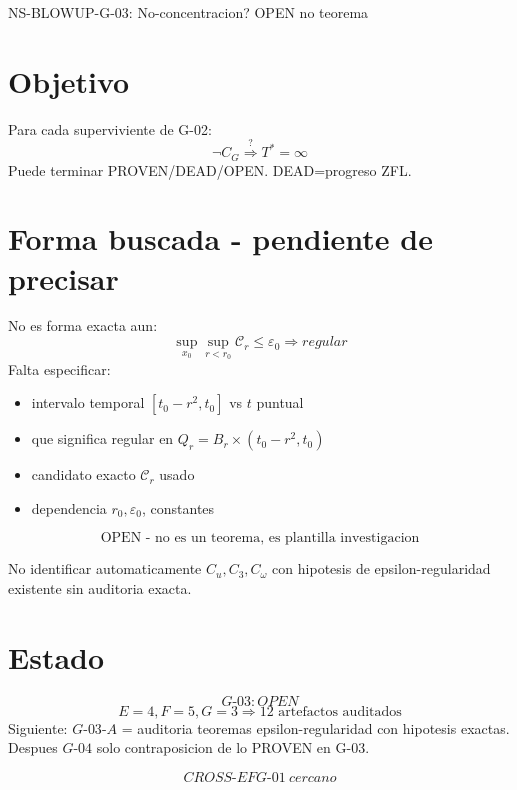 \documentclass{article}
\begin{document}
\begin{center}
{\Large NS-BLOWUP-G-03: No-concentracion? OPEN no teorema}
\end{center}

\section*{Objetivo}
Para cada superviviente de G-02:
\[
\boxed{\neg C_G \stackrel{?}{\Rightarrow} T^*=\infty}
\]
Puede terminar PROVEN/DEAD/OPEN. DEAD=progreso ZFL.

\section*{Forma buscada - pendiente de precisar}
No es forma exacta aun:
\[
\sup_{x_0}\sup_{r<r_0}\mathcal C_r \le \varepsilon_0 \Rightarrow regular
\]
Falta especificar:
\begin{itemize}
\item intervalo temporal $[t_0-r^2,t_0]$ vs $t$ puntual
\item que significa regular en $Q_r=B_r\times(t_0-r^2,t_0)$
\item candidato exacto $\mathcal C_r$ usado
\item dependencia $r_0,\varepsilon_0$, constantes
\end{itemize}

\[
\boxed{\text{OPEN - no es un teorema, es plantilla investigacion}}
\]

No identificar automaticamente $C_u,C_3,C_\omega$ con hipotesis de epsilon-regularidad existente sin auditoria exacta.

\section*{Estado}
\[
\boxed{G\text{-}03: OPEN}
\]
\[
\boxed{E=4,F=5,G=3 \Rightarrow 12\text{ artefactos auditados}}
\]
Siguiente: $G\text{-}03\text{-}A$ = auditoria teoremas epsilon-regularidad con hipotesis exactas.
Despues $G\text{-}04$ solo contraposicion de lo PROVEN en G-03.

\[
\boxed{CROSS\text{-}EFG\text{-}01\ cercano}
\]
\end{document}
